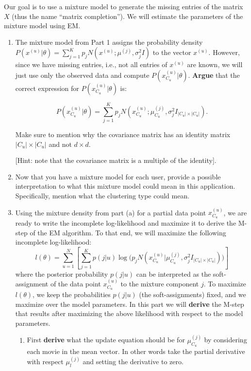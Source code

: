 \begin{enumerate}
Our goal is to use a mixture model to generate the missing entries of the matrix $X$ (thus the name ``matrix completion''). We will estimate the parameters of the mixture model using EM.

\begin{enumerate}
\item The mixture model from Part 1 assigns the probability density $P(x^{(u)} | \theta) = \sum^{K}_{j=1} p_j N(x^{(u)}; \mu^{(j)}, \sigma^2_j I)$ to the vector $x^{(u)}$. However, since we have missing entries, i.e., not all entries of $x^{(u)}$ are known, we will just use only the observed data and compute $P(x^{(u)}_{C_u} | \theta)$. \textbf{Argue} that the correct expression for $P(x^{(u)}_{C_u}  | \theta)$ is:

 $$P(x^{(u)}_{C_u}  | \theta) = \sum^{K}_{j=1} p_j N(x^{(u)}_{C_u} ; \mu^{(j)}_{C_u} , \sigma^2_j I_{|C_u| \times |C_u|}).$$

Make sure to mention why the covariance matrix has an identity matrix $ |C_u| \times |C_u| $ and not $ d \times d $.

 [Hint: note that the covariance matrix is a multiple of the identity].


 \item Now that you have a mixture model for each user, provide a possible interpretation to what this mixture model could mean in this application. Specifically, mention what the clustering type could mean.

\item Using the mixture density from part (a) for a partial data point $x^{(u)}_{C_u}$, we are ready to write the incomplete log-likelihood and maximize it to derive the M-step of the EM algorithm.
To that end, we will maximize the following incomplete log-likelihood:
$$ l(\theta) = \sum_{u=1}^N \left[ \sum^{K}_{j=1} p(j|u) \log\bigl( p_j N(x^{(u)}_{C_u} | \mu^{(j)}_{C_u}, \sigma^2_j I_{|C_u| \times |C_u|} ) \bigr) \right]$$
where the posterior probability $p(j|u)$ can be interpreted as the soft-assignment of the data point $x^{(u)}_{C_u}$ to the mixture component $j$. To maximize $l( \theta)$, we keep the probabilities $p(j|u)$ (the soft-assignments) fixed, and we maximize over the model parameters. In this part we will \textbf{derive} the M-step that results after maximizing the above likelihood with respect to the model parameters.

\begin{enumerate}
\item  First {\bf derive } what the update equation should be for $\mu^{(j)}_{C_u}$ by considering each movie in the mean vector. In other words take the partial derivative with respect $\mu^{(j)}_{l}$ and setting the derivative to zero.


\end{enumerate}
\end{enumerate}
\end{enumerate}
